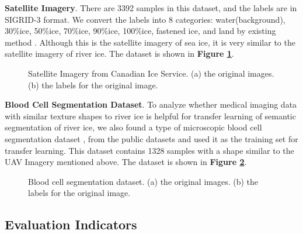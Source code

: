 \documentclass[a4paper,fleqn]{cas-dc}
\begin{document}
\textbf{Satellite Imagery}. There are 3392 samples in this dataset, and the labels are in SIGRID-3 format. We convert the labels into 8 categories: water(background), 30\%ice, 50\%ice, 70\%ice, 90\%ice, 100\%ice, fastened ice, and land by existing method \cite{Neural_Net_Mapping_of_Hudson_Bay_Sea_Ice_2021}. Although this is the satellite imagery of sea ice, it is very similar to the satellite imagery of river ice. The dataset is shown in \textbf{Figure \ref{Figure8}}.

\begin{figure}[h]
	\centering
	\caption{Satellite Imagery from Canadian Ice Service. (a) the original images. (b) the labels for the original image.}\label{Figure8}
\end{figure}

\textbf{Blood Cell Segmentation Dataset}. To analyze whether medical imaging data with similar texture shapes to river ice is helpful for transfer learning of semantic segmentation of river ice, we also found a type of microscopic blood cell segmentation dataset \cite{Blood_Cell_Segmentation_Dataset_2023}, from the public datasets and used it as the training set for transfer learning. This dataset contains 1328 samples with a shape similar to the UAV Imagery mentioned above. The dataset is shown in \textbf{Figure \ref{Figure9}}.

\begin{figure}[h]
	\centering
	\caption{Blood cell segmentation dataset. (a) the original images. (b) the labels for the original image.}\label{Figure9}
\end{figure}

\subsection{Evaluation Indicators}
\end{document}
